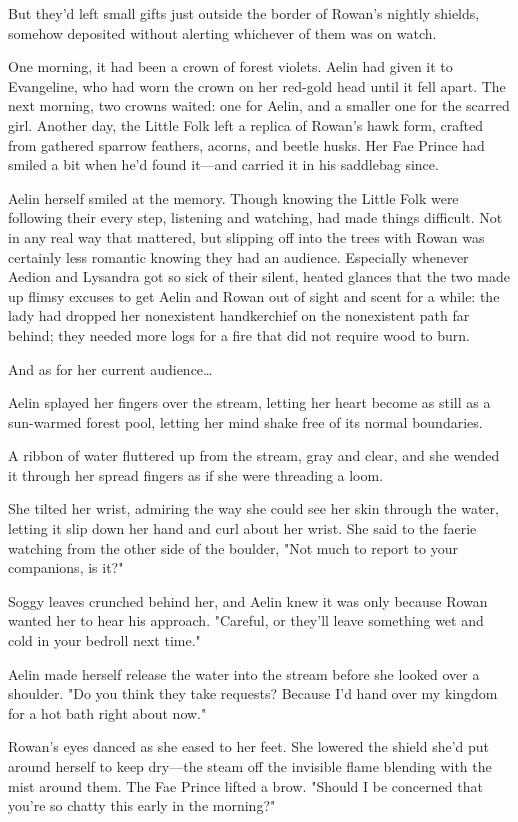 But they'd left small gifts just outside the border of Rowan's nightly shields, somehow deposited without alerting whichever of them was on watch.

One morning, it had been a crown of forest violets. Aelin had given it to Evangeline, who had worn the crown on her red-gold head until it fell apart. The next morning, two crowns waited: one for Aelin, and a smaller one for the scarred girl. Another day, the Little Folk left a replica of Rowan's hawk form, crafted from gathered sparrow feathers, acorns, and beetle husks. Her Fae Prince had smiled a bit when he'd found it---and carried it in his saddlebag since.

Aelin herself smiled at the memory. Though knowing the Little Folk were following their every step, listening and watching, had made things
 difficult. Not in any real way that mattered, but slipping off into the trees with Rowan was certainly less romantic knowing they had an audience. Especially whenever Aedion and Lysandra got so sick of their silent, heated glances that the two made up flimsy excuses to get Aelin and Rowan out of sight and scent for a while: the lady had dropped her nonexistent handkerchief on the nonexistent path far behind; they needed more logs for a fire that did not require wood to burn.

And as for her current audience\ldots{}

Aelin splayed her fingers over the stream, letting her heart become as still as a sun-warmed forest pool, letting her mind shake free of its normal boundaries.

A ribbon of water fluttered up from the stream, gray and clear, and she wended it through her spread fingers as if she were threading a loom.

She tilted her wrist, admiring the way she could see her skin through the water, letting it slip down her hand and curl about her wrist. She said to the faerie watching from the other side of the boulder, "Not much to report to your companions, is it?"

Soggy leaves crunched behind her, and Aelin knew it was only because Rowan wanted her to hear his approach. "Careful, or they'll leave something wet and cold in your bedroll next time."

Aelin made herself release the water into the stream before she looked over a shoulder. "Do you think they take requests? Because I'd hand over my kingdom for a hot bath right about now."

Rowan's eyes danced as she eased to her feet. She lowered the shield she'd put around herself to keep dry---the steam off the invisible flame blending with the mist around them. The Fae Prince lifted a brow. "Should I be concerned that you're so chatty this early in the morning?"

